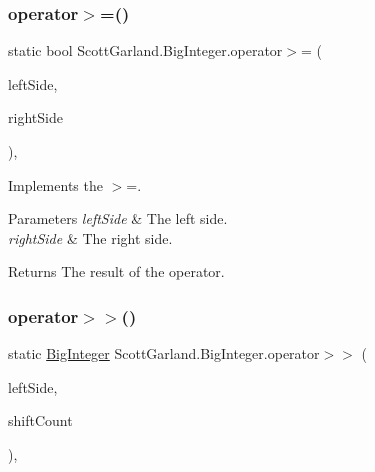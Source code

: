 \subsubsection{\texorpdfstring{operator$>$=()}{operator>=()}}
{\footnotesize\ttfamily static bool Scott\+Garland.\+Big\+Integer.\+operator$>$= (\begin{DoxyParamCaption}\item[{\hyperlink{class_scott_garland_1_1_big_integer}{Big\+Integer}}]{left\+Side,  }\item[{\hyperlink{class_scott_garland_1_1_big_integer}{Big\+Integer}}]{right\+Side }\end{DoxyParamCaption})\hspace{0.3cm}{\ttfamily [inline]}, {\ttfamily [static]}}



Implements the $>$=. 


\begin{DoxyParams}{Parameters}
{\em left\+Side} & The left side.\\
\hline
{\em right\+Side} & The right side.\\
\hline
\end{DoxyParams}
\begin{DoxyReturn}{Returns}
The result of the operator.
\end{DoxyReturn}
\mbox{\label{class_scott_garland_1_1_big_integer_a9353164b18bcdd76a5abf016025f419e}} 
\subsubsection{\texorpdfstring{operator$>$$>$()}{operator>>()}}
{\footnotesize\ttfamily static \hyperlink{class_scott_garland_1_1_big_integer}{Big\+Integer} Scott\+Garland.\+Big\+Integer.\+operator$>$$>$ (\begin{DoxyParamCaption}\item[{\hyperlink{class_scott_garland_1_1_big_integer}{Big\+Integer}}]{left\+Side,  }\item[{int}]{shift\+Count }\end{DoxyParamCaption})\hspace{0.3cm}{\ttfamily [inline]}, {\ttfamily [static]}}



